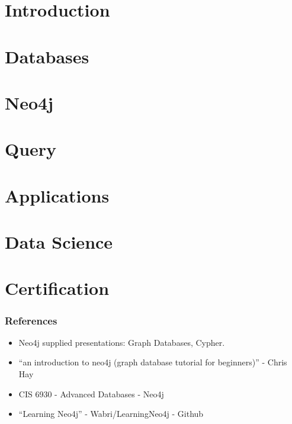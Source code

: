 \section[Intro]{Introduction}



\section[Db]{Databases}


\section[Neo4j]{Neo4j}


\section[Query]{Query}


\section[Apps]{Applications}


\section[DS]{Data Science}



\section[Cert]{Certification}


\begin{frame}\frametitle{References}
\begin{itemize}
\item Neo4j supplied presentations: Graph Databases, Cypher.
\item ``an introduction to neo4j (graph database tutorial for beginners)'' - Chris Hay
\item CIS 6930 - Advanced Databases - Neo4j 
\item ``Learning Neo4j'' - Wabri/LearningNeo4j - Github
\end{itemize}
\end{frame}